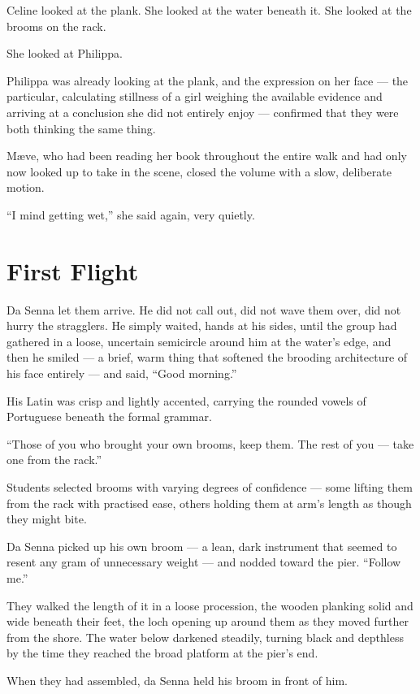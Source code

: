 Celine looked at the plank. She looked at the water beneath it. She looked at the brooms on the rack.
 
She looked at Philippa.
 
Philippa was already looking at the plank, and the expression on her face --- the particular, calculating stillness of a girl weighing the available evidence and arriving at a conclusion she did not entirely enjoy --- confirmed that they were both thinking the same thing.
 
Mæve, who had been reading her book throughout the entire walk and had only now looked up to take in the scene, closed the volume with a slow, deliberate motion.
 
\enquote{I mind getting wet,} she said again, very quietly.
 
\section*{First Flight}
 
Da Senna let them arrive. He did not call out, did not wave them over, did not hurry the stragglers. He simply waited, hands at his sides, until the group had gathered in a loose, uncertain semicircle around him at the water's edge, and then he smiled --- a brief, warm thing that softened the brooding architecture of his face entirely --- and said, \enquote{Good morning.}
 
His Latin was crisp and lightly accented, carrying the rounded vowels of Portuguese beneath the formal grammar.
 
\enquote{Those of you who brought your own brooms, keep them. The rest of you --- take one from the rack.}
 
Students selected brooms with varying degrees of confidence --- some lifting them from the rack with practised ease, others holding them at arm's length as though they might bite.
 
Da Senna picked up his own broom --- a lean, dark instrument that seemed to resent any gram of unnecessary weight --- and nodded toward the pier. \enquote{Follow me.}
 
They walked the length of it in a loose procession, the wooden planking solid and wide beneath their feet, the loch opening up around them as they moved further from the shore. The water below darkened steadily, turning black and depthless by the time they reached the broad platform at the pier's end.
 
When they had assembled, da Senna held his broom in front of him.
 
